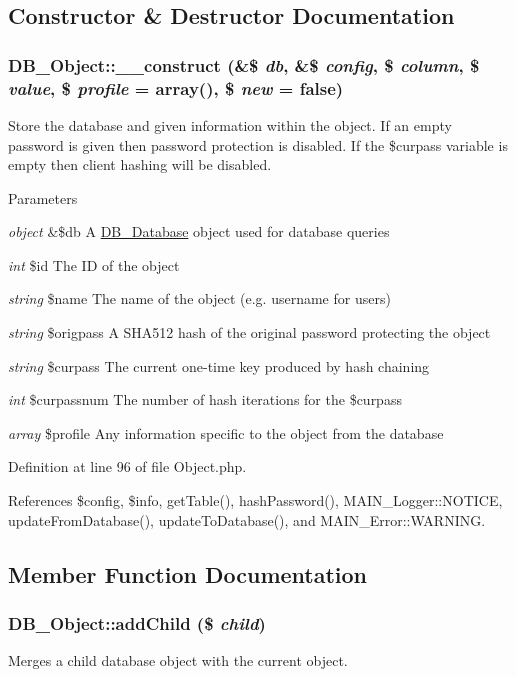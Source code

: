 \subsection{Constructor \& Destructor Documentation}
\hypertarget{classDB__Object_a7e3792ecc489d4039ecef05574005aae}{
\subsubsection[{\_\-\_\-construct}]{\setlength{\rightskip}{0pt plus 5cm}DB\_\-Object::\_\-\_\-construct (\&\$ {\em db}, \/  \&\$ {\em config}, \/  \$ {\em column}, \/  \$ {\em value}, \/  \$ {\em profile} = {\ttfamily array()}, \/  \$ {\em new} = {\ttfamily false})}}
\label{dc/d6d/classDB__Object_a7e3792ecc489d4039ecef05574005aae}
Store the database and given information within the object. If an empty password is given then password protection is disabled. If the \$curpass variable is empty then client hashing will be disabled.


\begin{DoxyParams}{Parameters}
\item[{\em object}]\&\$db A \hyperlink{classDB__Database}{DB\_\-Database} object used for database queries \item[{\em int}]\$id The ID of the object \item[{\em string}]\$name The name of the object (e.g. username for users) \item[{\em string}]\$origpass A SHA512 hash of the original password protecting the object \item[{\em string}]\$curpass The current one-\/time key produced by hash chaining \item[{\em int}]\$curpassnum The number of hash iterations for the \$curpass \item[{\em array}]\$profile Any information specific to the object from the database \end{DoxyParams}


Definition at line 96 of file Object.php.

References \$config, \$info, getTable(), hashPassword(), MAIN\_\-Logger::NOTICE, updateFromDatabase(), updateToDatabase(), and MAIN\_\-Error::WARNING.

\subsection{Member Function Documentation}
\hypertarget{classDB__Object_aee226b738dafa7018cd39cc66a0d8665}{
\subsubsection[{addChild}]{\setlength{\rightskip}{0pt plus 5cm}DB\_\-Object::addChild (\$ {\em child})}}
\label{dc/d6d/classDB__Object_aee226b738dafa7018cd39cc66a0d8665}
Merges a child database object with the current object.

